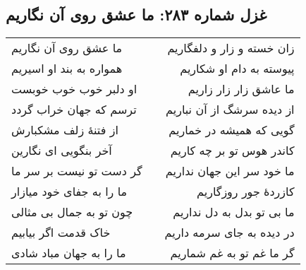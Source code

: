 \begin{center}
\section*{غزل شماره ۲۸۳: ما عشق روی آن نگاریم}
\label{sec:283}
\begin{longtable}{l p{0.5cm} r}
ما عشق روی آن نگاریم
&&
زان خسته و زار و دلفگاریم
\\
همواره به بند او اسیریم
&&
پیوسته به دام او شکاریم
\\
او دلبر خوب خوب خوبست
&&
ما عاشق زار زار زاریم
\\
ترسم که جهان خراب گردد
&&
از دیده سرشگ از آن نباریم
\\
از فتنهٔ زلف مشکبارش
&&
گویی که همیشه در خماریم
\\
آخر بنگویی ای نگارین
&&
کاندر هوس تو بر چه کاریم
\\
گر دست تو نیست بر سر ما
&&
ما خود سر این جهان نداریم
\\
ما را به جفای خود میازار
&&
کازردهٔ جور روزگاریم
\\
چون تو به جمال بی مثالی
&&
ما بی تو بدل به دل نداریم
\\
خاک قدمت اگر بیابیم
&&
در دیده به جای سرمه داریم
\\
ما را به جهان مباد شادی
&&
گر ما غم تو به غم شماریم
\\
\end{longtable}
\end{center}
